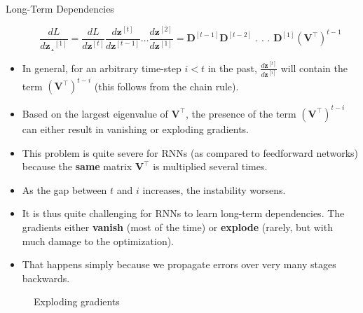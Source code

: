 \begin{vbframe}{Long-Term Dependencies}
\begin{itemize}
    $$ \frac{d L}{d \mathbf{z}¸^{[1]}} = \frac{d L}{d \mathbf{z}^{[t]}} \frac{d \mathbf{z}^{[t]}}{d \mathbf{z}^{[t-1]}} \dots \frac{d \mathbf{z}^{[2]}}{d \mathbf{z}^{[1]}} = \mathbf{D}^{[t-1]} \mathbf{D}^{[t-2]}   \text{ . . . } \mathbf{D}^{[1]} (\mathbf{V}^\top)^{t-1}$$
    \item In general, for an arbitrary time-step $i<t$ in the past, $\frac{d\mathbf{z}^{[t]}}{d\mathbf{z}^{[i]}}$ will contain the term $(\mathbf{V}^\top)^{t-i}$ (this follows from the chain rule).
    \item Based on the largest eigenvalue of $\mathbf{V}^\top$, the presence of the term $(\mathbf{V}^\top)^{t-i}$ can either result in vanishing or exploding gradients.
    \item This problem is quite severe for RNNs (as compared to feedforward networks) because the \textbf{same} matrix $\mathbf{V}^\top$ is multiplied several times. \href{https://tinyurl.com/vangrad}{}
    \item As the gap between $t$ and $i$ increases, the instability worsens.
    \item It is thus quite challenging for RNNs to learn long-term dependencies. The gradients either \textbf{vanish} (most of the time) or \textbf{explode} (rarely, but with much damage to the optimization).
    \item That happens simply because we propagate errors over very many stages backwards.
  \end{itemize}
  
  \framebreak
  \begin{figure}
      \centering
      \caption{\footnotesize {Exploding gradients}}
  \end{figure}


\end{vbframe}
